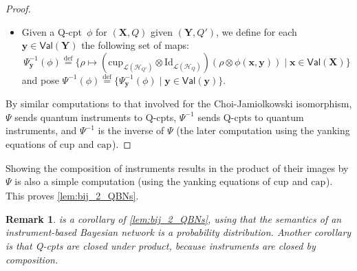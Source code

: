 \documentclass[10pt,a4paper]{article}
\newcommand*{\defeq}{\stackrel{\text{def}}{=}}
\newcommand*{\tens}{\otimes}
\newcommand*{\setofrv}[1]{\mathsf{Val}(#1)}
\newcommand{\bX}{\mathbf X}
\newcommand{\bY}{\mathbf Y}
\newcommand{\bx}{{\mathbf x}}
\newcommand{\by}{{\mathbf y}}
\newcommand{\be}{{\mathbf e}}
\newcommand{\tr}[1]{\mathrm{tr}\left(#1\right)}
\renewcommand{\L}{\mathcal{L}}
\newcommand{\HH}{\mathcal{H}}
\newcommand{\qfactfunc}[1]{\widehat{#1}}
\newcommand{\M}{\rho}
\newcommand{\reg}{Q}
\newcommand{\qreg}{\reg}
\newcommand*{\someqfact}{\phi}
\newcommand*{\id}[1][]{\mathrm{Id}_{#1}}
\newcommand*{\qcup}[1][]{\mathrm{cup}_{#1}}
\newcommand*{\qcap}[1][]{\mathrm{cap}_{#1}}
\newcommand*{\qCPT}{Q-\textsf{cpt}\xspace}
\newcommand*{\qCPTs}{Q-\textsf{cpt}s\xspace}
\newtheorem{remark}[theorem]{Remark}
\begin{document}
\begin{proof}
\begin{itemize}
\item
Given a \qCPT\ $\someqfact$ for $(\bX,\qreg)$ given $(\bY, \qreg')$, we define for each $\by\in\setofrv{\bY}$ the following set of maps:
\begin{equation*}
\Psi^{-1}_{\by}(\someqfact)
\defeq
\{ \M \mapsto (\qcup[\L(\HH_{\qreg'})] \tens \id[\L(\HH_\qreg)]) (\M \tens \someqfact(\bx,\by)) \mid \bx\in\setofrv{\bX}\}
\end{equation*}
and pose $\Psi^{-1}(\someqfact) \defeq \{\Psi^{-1}_{\by}(\someqfact)\mid \by\in\setofrv{\by}\}$.
\end{itemize}
By similar computations to that involved for the Choi-Jamiolkowski isomorphism, $\Psi$ sends quantum instruments to \qCPTs, $\Psi^{-1}$ sends \qCPTs to quantum instruments, and $\Psi^{-1}$ is the inverse of $\Psi$ (the later computation using the yanking equations of $\qcup$ and $\qcap$).
\end{proof}

Showing the composition of instruments results in the product of their images by $\Psi$ is also a simple computation (using the yanking equations of $\qcup$ and $\qcap$).
This proves \cref{lem:bij_2_QBNs}.

\begin{remark}
 is a corollary of \cref{lem:bij_2_QBNs}, using that the semantics of an instrument-based Bayesian network is a probability distribution.
Another corollary is that \qCPTs are closed under product, because instruments are closed by composition.
\end{remark}
\end{document}
